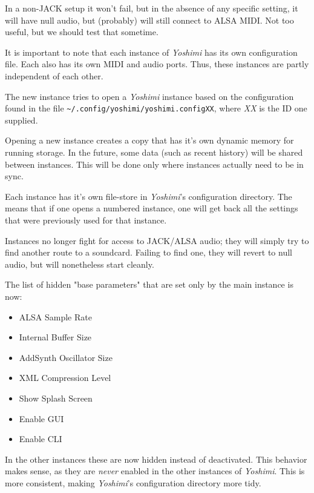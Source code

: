    In a non-JACK setup it won't fail, but in the absence of any specific
   setting, it will have null audio, but (probably) will still connect to ALSA
   MIDI.  Not too useful, but we should test that sometime.

   It is important to note that each instance of \textsl{Yoshimi} has its
   own configuration file.  Each also has its own MIDI and audio ports.
   Thus, these instances are partly independent of each other.

   The new instance tries to open a \textsl{Yoshimi} instance based on the
   configuration found in the file
   \texttt{\textasciitilde/.config/\-yoshimi/\-yoshimi.configXX}, where
   \textsl{XX} is the ID one supplied.

   Opening a new instance creates a copy that has it's own dynamic memory for
   running storage. In the future, some data (such as recent history) will be
   shared between instances. This will be done only where instances actually
   need to be in sync.

   Each instance has it's own file-store in \textsl{Yoshimi}'s configuration
   directory. The means that if one opens a numbered instance, one will get
   back all the settings that were previously used for that instance.

   Instances no longer fight for access to JACK/ALSA audio; they will simply
   try to find another route to a soundcard. Failing to find one,
   they will revert to null audio, but will nonetheless start cleanly.

   The list of hidden "base parameters" that are set only by the main instance is
   now:

   \begin{itemize}
      \item ALSA Sample Rate
      \item Internal Buffer Size
      \item AddSynth Oscillator Size
      \item XML Compression Level
      \item Show Splash Screen
      \item Enable GUI
      \item Enable CLI
   \end{itemize}

   In the other instances these are now hidden instead of deactivated.  This
   behavior makes sense, as they are \textsl{never} enabled in the other
   instances of \textsl{Yoshimi}. This is more consistent, making
   \textsl{Yoshimi}'s configuration directory more tidy.

